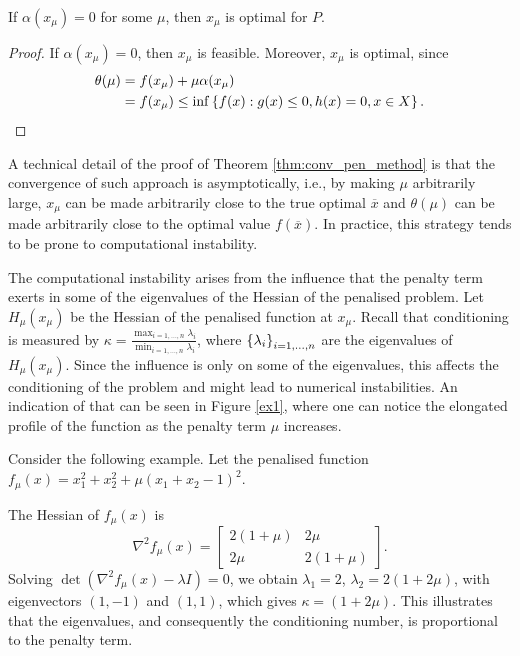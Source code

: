 \begin{corollary}
	If $\alpha(x_\mu) =0$ for some $\mu$, then $x_\mu$ is optimal for $P$.
\end{corollary}
\begin{proof}
	If $\alpha(x_\mu) =0$, then $x_\mu$ is feasible. Moreover, $x_\mu$ is optimal, since
	\begin{align*}
		\theta(\mu) & = f(x_\mu) + \mu\alpha(x_\mu) \\
            & = f(x_\mu) \leq \inf\left\{ f(x):g(x) \leq 0, h(x) = 0, x \in X \right \}. \qedhere
	\end{align*}
\end{proof}

A technical detail of the proof of Theorem \ref{thm:conv_pen_method} is that the convergence of such approach is asymptotically, i.e., by making $\mu$ arbitrarily large, $x_\mu$ can be made arbitrarily close to the true optimal $\overline{x}$ and $\theta(\mu)$ can be made arbitrarily close to the optimal value $f(\overline{x})$. In practice, this strategy tends to be prone to computational instability.

The computational instability arises from the influence that the penalty term exerts in some of the eigenvalues of the Hessian of the penalised problem. Let $H_\mu(x_\mu)$ be the Hessian of the penalised function at $x_\mu$. Recall that conditioning is measured by $\kappa = \frac{\max_{i=1,\dots,n} \lambda_i}{\min_{i=1,\dots,n} \lambda_i}$, where $\left\{ \lambda_i \right \}_{i=1,\dots,n}$ are the eigenvalues of $H_\mu(x_\mu)$. Since the influence is only on some of the eigenvalues, this affects the conditioning of the problem and might lead to numerical instabilities. An indication of that can be seen in Figure \ref{ex1}, where one can notice the elongated profile of the function as the penalty term $\mu$ increases. 

Consider the following example. Let the penalised function $f_\mu(x) = x_1^2 + x_2^2 + \mu(x_1 + x_2 - 1)^2$. 

The Hessian of $f_\mu(x)$ is
%
$$\nabla^2 f_\mu(x) = \begin{bmatrix}2(1+\mu) & 2\mu \\ 2\mu & 2(1+\mu)\end{bmatrix}.$$ 
%
Solving $\det(\nabla^2f_\mu(x) - \lambda I)=0$, we obtain $\lambda_1 = 2$, $\lambda_2 = 2(1 + 2\mu)$, with eigenvectors $(1,-1)$ and $(1,1)$, which gives $\kappa = (1 + 2\mu)$. This illustrates that the eigenvalues, and consequently the conditioning number, is proportional to the penalty term. 


